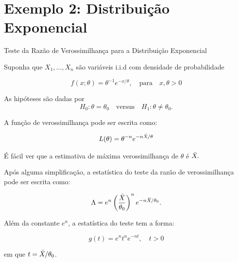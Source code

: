 \documentclass[12pt]{beamer}
\begin{document}
\section{Exemplo 2: Distribuição Exponencial}
\begin{frame}{Teste da Razão de Verossimilhança para a Distribuição Exponencial}
\begin{block}{}
\justifying
Suponha que $X_1, \ldots, X_n$ são variáveis i.i.d com densidade de probabilidade

\[
f(x; \theta) = \theta^{-1} e^{-x/\theta}, \quad \text{para} \quad x, \theta > 0
\]

As hipóteses são dadas por 
\[
H_0: \theta = \theta_0 \quad \text{versus} \quad H_1: \theta \neq \theta_0.
\]

A função de verossimilhança pode ser escrita como:

\[
L(\theta) = \theta^{-n} e^{-n\Bar{X}/\theta}
\]

É fácil ver que a estimativa de máxima verossimilhança de $\theta$ é $\Bar{X}.$
\end{block}
\end{frame}

\begin{frame}{}
\begin{block}{}
\justifying
Após alguma simplificação, a estatística do teste da razão de verossimilhança pode ser escrita como:

\[
\Lambda = e^n\left(\dfrac{\Bar{X}}{\theta_0}\right)^{n}e^{-n\Bar{X}/\theta_{0}}.
\]

Além da constante $e^n$, a estatística do teste tem a forma:

\[
g(t) = e^{n}t^n e^{-nt}, \quad t > 0
\]

em que $t = \Bar{X}/\theta_0$.
\end{block}
\end{frame}
\end{document}
